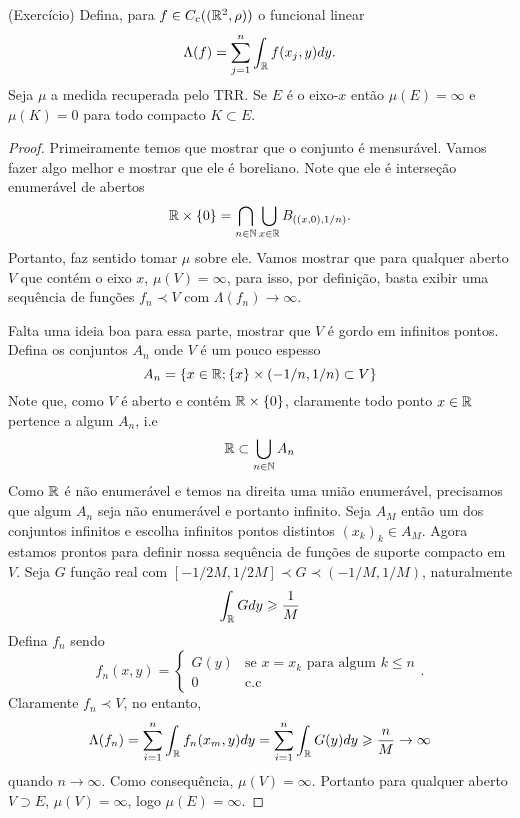 \begin{prop}
    (Exercício) Defina, para $f \in C_c((\mathbb{R}^2,\rho))$ o funcional linear
    $$\Lambda(f) = \sum_{j=1}^{n} \int_{\mathbb{R}} f(x_j,y) dy.$$
    Seja $\mu$ a medida recuperada pelo TRR. Se $E$ é o eixo-$x$ então $\mu(E) = \infty$
    e $\mu(K) = 0$ para todo compacto $K \subset E$.
\end{prop}

\begin{proof}
    Primeiramente temos que mostrar que o conjunto é mensurável. Vamos fazer algo melhor e mostrar que ele 
    é boreliano. Note que ele é interseção enumerável de abertos
    $$\mathbb{R} \times \{0\} = \bigcap_{n \in \mathbb{N}} \bigcup_{x \in \mathbb{R}} B_{((x,0), 1/n)}.$$
    Portanto, faz sentido tomar $\mu$ sobre ele. Vamos mostrar que para qualquer aberto $V$ que contém o eixo $x$,
    $\mu(V) = \infty$, para isso, por definição, basta exibir uma sequência de funções $f_n \prec V$ com $\Lambda(f_n) \to \infty$.

    Falta uma ideia boa para essa parte, mostrar que $V$ é gordo em infinitos pontos. Defina os conjuntos $A_n$ onde $V$ é um pouco espesso
    $$A_n = \{x \in \mathbb{R} ; \{x\} \times (-1/n, 1/n) \subset V\}$$
    Note que, como $V$ é aberto e contém $\mathbb{R} \times \{0\}$, claramente todo ponto $x \in \mathbb{R}$ pertence a algum $A_n$, i.e
    $$\mathbb{R} \subset \bigcup_{n \in \mathbb{N}} A_n$$
    Como $\mathbb{R}$ é não enumerável e temos na direita uma união enumerável, precisamos que algum $A_n$ seja não enumerável e portanto
    infinito. Seja $A_M$ então um dos conjuntos infinitos e escolha infinitos pontos  distintos $(x_k)_k \in A_M$.
    Agora estamos prontos para definir nossa sequência de funções de suporte compacto em $V$. Seja $G$ função real 
    com $[-1/2M, 1/2M] \prec G \prec (-1/M, 1/M)$, naturalmente
    $$\int_{\mathbb{R}} G dy \geqslant \frac{1}{M}$$
    Defina $f_n$ sendo
    $$f_n(x,y) = \begin{cases}
        G(y) & \text{se } x = x_k \text{ para algum } k \leq n\\ 
        0 & \text{c.c}
    \end{cases}.$$
    Claramente $f_n \prec V$, no entanto, 
    $$\Lambda(f_n) = \sum_{i=1}^{n} \int_{\mathbb{R}} f_n(x_m, y) dy = \sum_{i=1}^{n} \int_{\mathbb{R}} G(y) dy \geqslant \frac{n}{M} \rightarrow \infty$$
    quando $n \to \infty$. Como consequência, $\mu(V) = \infty$. Portanto para qualquer aberto $V \supset E$, $\mu(V) = \infty$,
    logo $\mu(E) = \infty$.


\end{proof}
